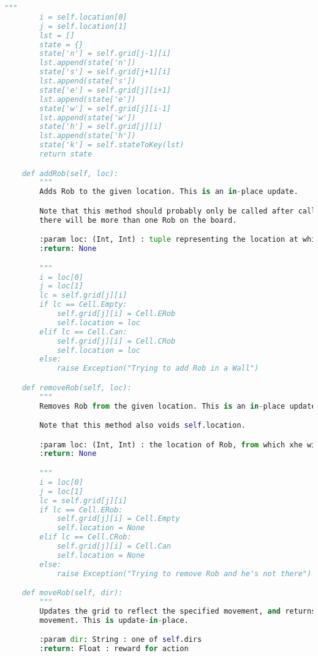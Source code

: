 \documentclass[12pt,a4paper]{article}
\begin{document}
\begin{lstlisting}[language=Python,numbers=none,basicstyle=\tiny]
        """
        i = self.location[0]
        j = self.location[1]
        lst = []
        state = {}
        state['n'] = self.grid[j-1][i]
        lst.append(state['n'])
        state['s'] = self.grid[j+1][i]
        lst.append(state['s'])
        state['e'] = self.grid[j][i+1]
        lst.append(state['e'])
        state['w'] = self.grid[j][i-1]
        lst.append(state['w'])
        state['h'] = self.grid[j][i]
        lst.append(state['h'])
        state['k'] = self.stateToKey(lst)
        return state

    def addRob(self, loc):
        """
        Adds Rob to the given location. This is an in-place update.

        Note that this method should probably only be called after calling self.removeRob(), otherwise
        there will be more than one Rob on the board.

        :param loc: (Int, Int) : tuple representing the location at which to add Rob
        :return: None

        """
        i = loc[0]
        j = loc[1]
        lc = self.grid[j][i]
        if lc == Cell.Empty:
            self.grid[j][i] = Cell.ERob
            self.location = loc
        elif lc == Cell.Can:
            self.grid[j][i] = Cell.CRob
            self.location = loc
        else:
            raise Exception("Trying to add Rob in a Wall")

    def removeRob(self, loc):
        """
        Removes Rob from the given location. This is an in-place update.

        Note that this method also voids self.location.

        :param loc: (Int, Int) : the location of Rob, from which xhe will be removed.
        :return: None

        """
        i = loc[0]
        j = loc[1]
        lc = self.grid[j][i]
        if lc == Cell.ERob:
            self.grid[j][i] = Cell.Empty
            self.location = None
        elif lc == Cell.CRob:
            self.grid[j][i] = Cell.Can
            self.location = None
        else:
            raise Exception("Trying to remove Rob and he's not there")

    def moveRob(self, dir):
        """
        Updates the grid to reflect the specified movement, and returns the reward for said
        movement. This is update-in-place.

        :param dir: String : one of self.dirs
        :return: Float : reward for action


\end{lstlisting}
\end{document}
